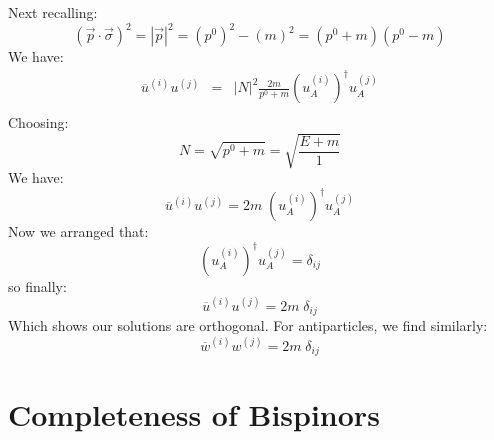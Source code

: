 \documentclass[12pt]{article}
\begin{document}
Next recalling:
$$(\vec{p}\cdot \vec{\sigma})^2 = |\vec{p}|^2 = (p^0)^2-(m)^2 = (p^0+m)(p^0-m)$$
We have:
\begin{eqnarray*}
\overline{u}^{(i)} u^{(j)} &=& |N|^2 \frac{2m}{p^0+m} (u_A^{(i)})^\dagger u_A^{(j)}\\
\end{eqnarray*}
Choosing:
$$N = \sqrt{p^0+m} = \sqrt{\frac{E+m}{1}}$$
We have:
$$\overline{u}^{(i)} u^{(j)} = 2m \; (u_A^{(i)})^\dagger u_A^{(j)}$$
Now we arranged that:
$$(u_A^{(i)})^\dagger u_A^{(j)} = \delta_{ij}$$
so finally:
$$\overline{u}^{(i)} u^{(j)} = 2m \; \delta_{ij}$$
Which shows our solutions are orthogonal.  For antiparticles, we find similarly:
$$\overline{w}^{(i)} w^{(j)} = 2m \; \delta_{ij}$$


\section{Completeness of Bispinors}
\end{document}
